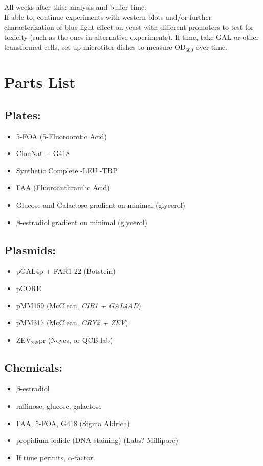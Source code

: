 \documentclass[landscape,a4paper]{article}
\begin{document}
    {\Large All weeks after this: analysis and buffer time.}\\

    {\large If able to, continue experiments with western blots and/or further characterization of blue light effect on yeast with different promoters to test for toxicity (such as the ones in alternative experiments).  If time, take GAL or other transformed cells, set up microtiter dishes to measure OD$_{600}$ over time.} 


\pagebreak
\section*{Parts List}
\begin{minipage}[t]{0.3\textwidth}
    
\subsection*{Plates:}
\begin{itemize}
    \item 5-FOA (5-Fluoroorotic Acid)
    \item ClonNat + G418
    \item Synthetic Complete -LEU -TRP
    \item FAA (Fluoroanthranilic Acid)
    \item Glucose and Galactose gradient on minimal (glycerol)
    \item $\beta$-estradiol gradient on minimal (glycerol)
\end{itemize} 
\subsection*{Plasmids:}
\begin{itemize}
    \item pGAL4p + FAR1-22 (Botstein)
    \item pCORE
    \item pMM159 (McClean, \emph{CIB1 + GAL4AD})
    \item pMM317 (McClean, \emph{CRY2 + ZEV})
    \item ZEV$_{268}$pr (Noyes, or QCB lab)
\end{itemize}
\subsection*{Chemicals:}
\begin{itemize}
    \item $\beta$-estradiol
    \item raffinose, glucose, galactose
    \item FAA, 5-FOA, G418 (Sigma Aldrich)
    \item propidium iodide (DNA staining) (Labs? Millipore)
    \item If time permits, $\alpha$-factor.
\end{itemize}
\end{minipage}
\end{document}
